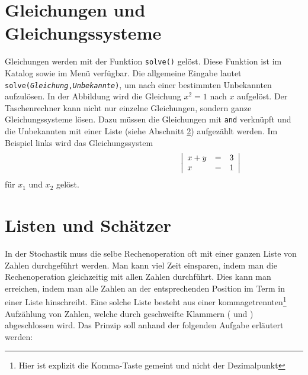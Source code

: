 \documentclass[a4paper,11pt,notitlepage,halfparskip,headsepline,normalheadings,twoside]{scrartcl}
\newlength{\tikey}
\newcommand{\keystroke}[1]{\settowidth{\tikey}{\scriptsize #1}\psframebox[framearc=0.2]{\parbox{\tikey}{\scriptsize\textsf{#1}}}}
\begin{document}
\section{Gleichungen und Gleichungssysteme}
\begin{window}
Gleichungen werden mit der Funktion \texttt{solve()} gelöst. Diese Funktion ist
im Katalog sowie im Menü \keystroke{F2} verfügbar. Die allgemeine Eingabe lautet
\texttt{solve(\textit{Gleichung},\textit{Unbekannte})}, um nach einer bestimmten
Unbekannten aufzulösen. In der Abbildung wird die Gleichung $x^2=1$ nach $x$
aufgelöst. Der Taschenrechner kann nicht nur einzelne Gleichungen, sondern ganze
Gleichungssysteme lösen. Dazu müssen die Gleichungen mit
\texttt{\textvisiblespace and\textvisiblespace} verknüpft und die Unbekannten
mit einer Liste (siehe Abschnitt \ref{list}) aufgezählt werden. Im Beispiel links wird das
Gleichungssystem
$$
\hspace{0.4\textwidth}\left|\begin{array}{lcc}
x+y&=&3\\
x&=&1\\
\end{array}\right|
$$
für $x_1$ und $x_2$ gelöst.
\end{window}

\section{Listen und Schätzer}\label{list}
In der Stochastik muss die selbe Rechenoperation oft mit einer ganzen Liste von
Zahlen durchgeführt werden. Man kann viel Zeit einsparen, indem man die
Rechenoperation gleichzeitig mit allen Zahlen durchführt. Dies kann man
erreichen, indem man alle Zahlen an der entsprechenden Position im Term in einer
Liste hinschreibt. Eine solche Liste besteht aus einer
kommagetrennten\footnote{Hier ist explizit die Komma-Taste \keystroke{,} gemeint
und nicht der Dezimalpunkt \keystroke{.}} Aufzählung von Zahlen, welche durch
geschweifte Klammern (\keystroke{\{} und \keystroke{\}}) abgeschlossen wird. Das
Prinzip soll anhand der folgenden Aufgabe erläutert werden:
\end{document}
